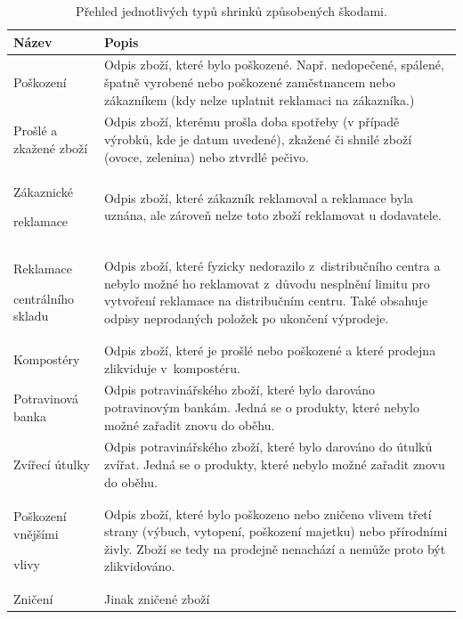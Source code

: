 \begin{table}[hbtp!]
    \caption{Přehled jednotlivých typů shrinků způsobených škodami.}
    \label{tab:sh:dam}
    \begin{tabular}{ p{4cm} p{10.5cm}}
         Název             & Popis \\
    \hline
                Poškození               & Odpis zboží, které bylo poškozené. Např. nedopečené, spálené, špatně vyrobené nebo poškozené zaměstnancem nebo zákazníkem (kdy nelze uplatnit reklamaci na zákazníka.)       \\
                Prošlé a zkažené zboží  & Odpis zboží, kterému prošla doba spotřeby (v případě výrobků, kde je datum uvedené), zkažené či shnilé zboží (ovoce, zelenina) nebo ztvrdlé pečivo.       \\
                Zákaznické \par reklamace \strut  & Odpis zboží, které zákazník reklamoval a reklamace byla uznána, ale zároveň nelze toto zboží reklamovat u dodavatele.      \\
                Reklamace \par centrálního skladu \strut   &  Odpis zboží, které fyzicky nedorazilo z~distribučního centra a nebylo možné ho reklamovat z~důvodu nesplnění limitu pro vytvoření reklamace na distribučním centru. Také obsahuje odpisy neprodaných položek po ukončení výprodeje.     \\
                Kompostéry              & Odpis zboží, které je prošlé nebo poškozené a které prodejna zlikviduje v~kompostéru.       \\
                Potravinová banka       & Odpis potravinářského zboží, které bylo darováno potravinovým bankám. Jedná se o produkty, které nebylo možné zařadit znovu do oběhu.    \\
                Zvířecí útulky          & Odpis potravinářského zboží, které bylo darováno do útulků zvířat. Jedná se o produkty, které nebylo možné zařadit znovu do oběhu.          \\
                Poškození vnějšími \par vlivy \strut %
                                        & Odpis zboží, které bylo poškozeno nebo zničeno vlivem třetí strany (výbuch, vytopení, poškození majetku) nebo přírodními živly. Zboží se tedy na prodejně nenachází a nemůže proto být zlikvidováno.      \\
                Zničení & Jinak zničené zboží \\
    \end{tabular}
\end{table}



\vspace*{1em}